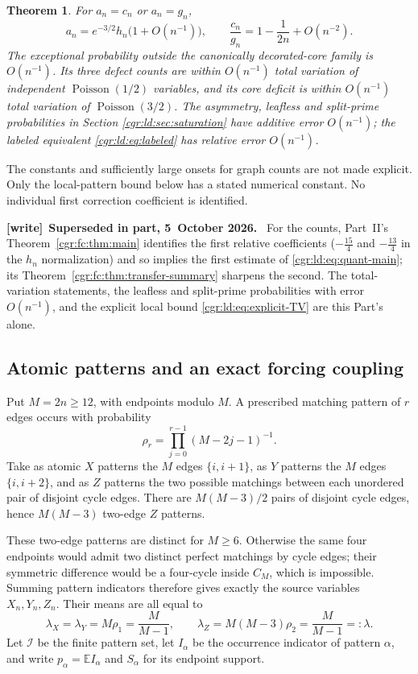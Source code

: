 \documentclass[11pt,letterpaper]{article}
\numberwithin{equation}{section}
\newtheorem{theorem}{Theorem}[section]
\theoremstyle{definition}\newtheorem{definition}[theorem]{Definition}
\theoremstyle{remark}\newtheorem{remark}[theorem]{Remark}
\newcommand{\EE}{\mathbb E}
\DeclareMathOperator{\Poi}{Poisson}
\newenvironment{writenote}[1][]{\par\smallskip\begingroup\small
 \noindent\textbf{[write]}\if\relax\detokenize{#1}\relax\else~\textbf{#1.}\fi\ }%
 {\par\endgroup\smallskip}
\begin{document}
\begin{theorem}\label{cgr:ld:thm:quantitative}
For $a_n=c_n$ or $a_n=g_n$,
\begin{equation}\label{cgr:ld:eq:quant-main}
 a_n=e^{-3/2}h_n\bigl(1+O(n^{-1})\bigr),\qquad
 \frac{c_n}{g_n}=1-\frac1{2n}+O(n^{-2}).
\end{equation}
The exceptional probability outside the canonically decorated-core
family is $O(n^{-1})$. Its three defect counts are within
$O(n^{-1})$ total variation of independent $\Poi(1/2)$ variables,
and its core deficit is within $O(n^{-1})$ total variation of
$\Poi(3/2)$. The asymmetry, leafless and split-prime probabilities
in Section \ref{cgr:ld:sec:saturation} have additive error $O(n^{-1})$;
the labeled equivalent \eqref{cgr:ld:eq:labeled} has relative error
$O(n^{-1})$.
\end{theorem}
The constants and sufficiently large onsets for graph counts are
not made explicit. Only the local-pattern bound below has a
stated numerical constant. No individual first correction
coefficient is identified.
\begin{writenote}[Superseded in part, 5~October 2026]
For the counts, Part~II's Theorem~\ref{cgr:fc:thm:main} identifies the first relative coefficients ($-\frac{15}4$ and $-\frac{13}4$ in the $h_n$ normalization) and so implies the first estimate of \eqref{cgr:ld:eq:quant-main}; its Theorem~\ref{cgr:fc:thm:transfer-summary} sharpens the second. The total-variation statements, the leafless and split-prime probabilities with error $O(n^{-1})$, and the explicit local bound \eqref{cgr:ld:eq:explicit-TV} are this Part's alone.
\end{writenote}

\subsection*{Atomic patterns and an exact forcing coupling}
Put $M=2n\ge12$, with endpoints modulo $M$. A prescribed
matching pattern of $r$ edges occurs with probability
\begin{equation}\label{cgr:ld:eq:pattern-prob}
 \rho_r=\prod_{j=0}^{r-1}(M-2j-1)^{-1}.
\end{equation}
Take as atomic $X$ patterns the $M$ edges $\{i,i+1\}$, as
$Y$ patterns the $M$ edges $\{i,i+2\}$, and as $Z$ patterns
the two possible matchings between each unordered pair of
disjoint cycle edges. There are $M(M-3)/2$ pairs of disjoint
cycle edges, hence $M(M-3)$ two-edge $Z$ patterns.

These two-edge patterns are distinct for $M\ge6$. Otherwise the
same four endpoints would admit two distinct perfect matchings
by cycle edges; their symmetric difference would be a four-cycle
inside $C_M$, which is impossible. Summing pattern indicators
therefore gives exactly the source variables $X_n,Y_n,Z_n$.
Their means are all equal to
\begin{equation}\label{cgr:ld:eq:local-means}
 \lambda_X=\lambda_Y=M\rho_1=\frac M{M-1},\qquad
 \lambda_Z=M(M-3)\rho_2=\frac M{M-1}=:\lambda.
\end{equation}
Let $\mathcal I$ be the finite pattern set, let $I_\alpha$ be
the occurrence indicator of pattern $\alpha$, and write
$p_\alpha=\EE I_\alpha$ and $S_\alpha$ for its endpoint support.
\end{document}
